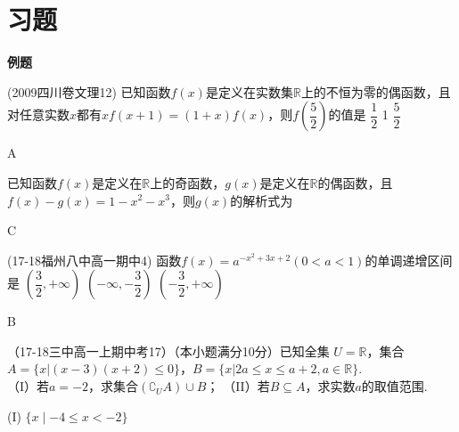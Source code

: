   \newtheorem*{Theorem}{定理}
  \makefront
\vspace{-1.5em}
\startexercise

\section{习题}
  \begin{exercise}{\large \bf 例\hspace{0.6em}题}
    \item%
      (2009四川卷文理12) 已知函数$f(x)$是定义在实数集$\mathbb{R}$上的不恒为零的偶函数，且对任意实数$x$都有$xf(x+1)=(1+x)f(x) $，则$f(\dfrac{5}{2}) $的值是\xz
      {$\dfrac12$}
      {1}
      {$\dfrac52$}
      \begin{answer}
      A
      \end{answer}
    \item%
      已知函数$f(x)$是定义在$\mathbb{R}$上的奇函数，$g(x)$是定义在$\mathbb{R} $的偶函数，且$f(x)-g(x)=1-x^2-x^3 $，则$g(x) $的解析式为\xz
      \begin{answer}
      C
      \end{answer}
    \item%
      (17-18福州八中高一期中4)
      函数$f(x)=a^{-x^2+3x+2}(0<a<1)$的单调递增区间是\xz
        {$(\dfrac32,+\infty)$}
        {$(-\infty,-\dfrac32)$}
        {$(-\dfrac32,+\infty)$}
      \begin{answer}
      B
      \end{answer}
    \item%
      （17-18三中高一上期中考17）（本小题满分10分）已知全集 $U=\mathbb{R}$，集合$A=\{x|(x-3)(x+2)\leq0\} $，$B=\{x|2a\leq x\leq a+2,a\in \mathbb{R} \} $.\\
      （I）若$a=-2 $，求集合$(\complement_UA)\cup B $；
      （II）若$B\subseteq A $，求实数$a $的取值范围.
      \begin{answer}
       (I) $\{x\mid-4\leq x<-2 \} $

\end{answer}
\end{exercise}

